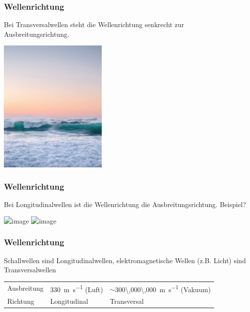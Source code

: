 \documentclass{beamer}
\begin{document}


\begin{frame}
\frametitle{Wellenrichtung}

Bei Transversalwellen steht die Wellenrichtung senkrecht zur Ausbreitungsrichtung. \\

\begin{center}
\includegraphics[width=0.4\textwidth]{wellen_meer.jpg}
\end{center} 


\end{frame}

\begin{frame}
\frametitle{Wellenrichtung}

Bei Longitudinalwellen ist die Wellenrichtung die Ausbreitungsrichtung. Beispiel? \pause
\vfill

\begin{center}
\includegraphics<2>[width=0.6\textwidth]{regenwurm_regenwurmfarben.png}
\includegraphics<3>[width=0.6\textwidth]{regenwurm_viridis.png}
\end{center}

\end{frame}



\begin{frame}
\frametitle{Wellenrichtung}
Schallwellen sind Longitudinalwellen, elektromagnetische Wellen (z.B. Licht) sind Transversalwellen \\[1cm]

\pause

\begin{tabular}{|l|l|l|}
\hline
        & \color{theme}{\textbf{Schallwellen}}  & \color{theme}{\textbf{Elektromagnetische Wellen}}     \\
\hline
Ausbreitung       & \SI{330}{\meter\per\second} (Luft)  &  \(\sim\)\SI{300\,000\,000}{\meter\per\second} (Vakuum)   \\
\hline
Richtung        & Longitudinal  & Transversal   \\
\hline
\end{tabular}

\end{frame}
\end{document}
